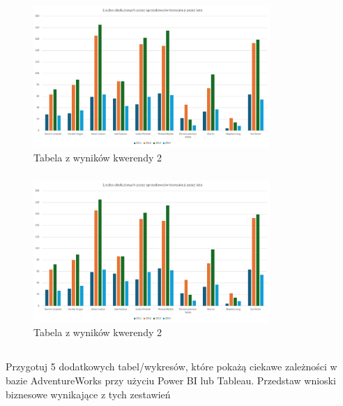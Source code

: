 \documentclass[a4paper,12pt]{article}
\begin{document}
\subsubsection{}

\begin{figure}[H]
    \centering
    \includegraphics[width=0.8\textwidth]{images/excel/02.png}
    \caption{Tabela z wyników kwerendy 2}
\end{figure}

\subsubsection{}

\begin{figure}[H]
    \centering
    \includegraphics[width=0.8\textwidth]{images/excel/02.png}
    \caption{Tabela z wyników kwerendy 2}
\end{figure}

\subsection{}

Przygotuj 5 dodatkowych tabel/wykresów, które pokażą ciekawe zależności w bazie AdventureWorks przy użyciu Power BI lub Tableau. Przedstaw wnioski biznesowe wynikające z tych zestawień
\end{document}
